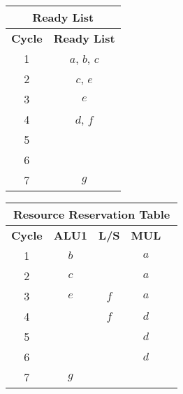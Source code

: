 \begin{examplebox}
    \highspace
    \begin{minipage}{0.35\textwidth}
        \centering
        \begin{tabular}{@{} c | c @{}}
            \toprule
            \multicolumn{2}{c}{Ready List} \\
            \midrule
            \textbf{Cycle} & \textbf{Ready List} \\
            \midrule
            1 & $a$, $b$, $c$ \\
            2 & $c$, $e$ \\
            3 & $e$ \\
            4 & $d$, $f$ \\
            5 & \\
            6 & \\
            7 & $g$ \\
            \bottomrule
        \end{tabular}
    \end{minipage}
    \hfill
    \begin{minipage}{0.6\textwidth}
        \centering
        \begin{tabular}{@{} c | c | c | c | c @{}}
            \toprule
            \multicolumn{5}{c}{Resource Reservation Table} \\
            \midrule
            \textbf{Cycle} & \textbf{ALU1} & \textbf{L/S} & \textbf{MUL} \\
            \midrule
            1 & $b$ &       & $a$   \\
            2 & $c$ &       & $a$   \\
            3 & $e$ & $f$   & $a$   \\
            4 &     & $f$   & $d$   \\
            5 &     &       & $d$   \\
            6 &     &       & $d$   \\
            7 & $g$ &       &       \\
            \bottomrule
        \end{tabular}
    \end{minipage}


\end{examplebox}
